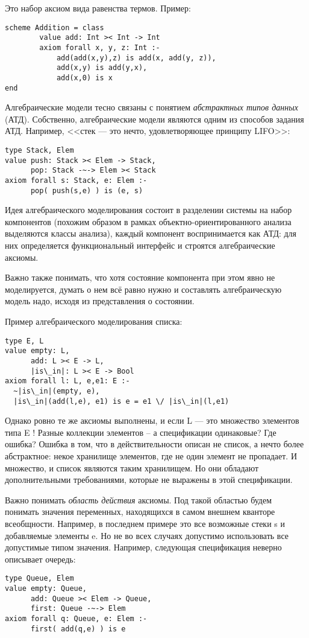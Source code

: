 Это набор аксиом вида равенства термов. Пример:
\begin{lstlisting}
scheme Addition = class
        value add: Int >< Int -> Int
        axiom forall x, y, z: Int :-
            add(add(x,y),z) is add(x, add(y, z)),
            add(x,y) is add(y,x),
            add(x,0) is x
end
\end{lstlisting}

Алгебраические модели тесно связаны с понятием \emph{абстрактных типов данных} (АТД). Собственно, алгебраические модели являются одним из способов задания АТД. Например, <<стек --- это нечто, удовлетворяющее принципу LIFO>>:
\begin{lstlisting}
type Stack, Elem
value push: Stack >< Elem -> Stack,
      pop: Stack -~-> Elem >< Stack
axiom forall s: Stack, e: Elem :-
      pop( push(s,e) ) is (e, s)
\end{lstlisting}

Идея алгебраического моделирования состоит в разделении системы на набор компонентов (похожим образом в рамках объектно-ориентированного анализа выделяются классы анализа), каждый компонент воспринимается как АТД: для них определяется функциональный интерфейс и строятся алгебраические аксиомы.

Важно также понимать, что хотя состояние компонента при этом явно не моделируется, думать о нем всё равно нужно и составлять алгебраическую модель надо, исходя из представления о состоянии.

Пример алгебраического моделирования списка:
\begin{lstlisting}[escapechar={|}]
type E, L
value empty: L,
      add: L >< E -> L,
      |is\_in|: L >< E -> Bool
axiom forall l: L, e,e1: E :-
  ~|is\_in|(empty, e),
  |is\_in|(add(l,e), e1) is e = e1 \/ |is\_in|(l,e1)
\end{lstlisting}

Однако ровно те же аксиомы выполнены, и если L --- это множество элементов типа E ! Разные коллекции элементов -- а спецификации одинаковые? Где ошибка? Ошибка в том, что в действительности описан не список, а нечто более абстрактное: некое хранилище элементов, где не один элемент не пропадает. И множество, и список являются таким хранилищем. Но они обладают дополнительными требованиями, которые не выражены в этой спецификации.


Важно понимать \emph{область действия} аксиомы. Под такой областью будем понимать значения переменных, находящихся в самом внешнем кванторе всеобщности. Например, в последнем примере это все возможные стеки s и добавляемые элементы e. Но не во всех случаях допустимо использовать все допустимые типом значения. Например, следующая спецификация неверно описывает очередь:
\begin{lstlisting}
type Queue, Elem
value empty: Queue,
      add: Queue >< Elem -> Queue,
      first: Queue -~-> Elem
axiom forall q: Queue, e: Elem :-
      first( add(q,e) ) is e
\end{lstlisting}

